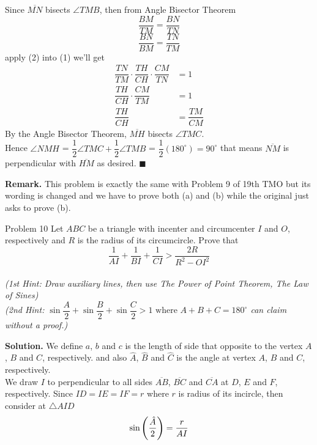 \documentclass[12pt]{article}
\begin{document}
Since $\overline{MN}$ bisects $\angle{TMB}$, then from Angle Bisector Theorem
\begin{equation*}
\dfrac{BM}{TM}  = \dfrac{BN}{TN} 
\end{equation*}
\begin{equation}
\dfrac{BN}{BM}  = \dfrac{TN}{TM} 
\end{equation}
apply (2) into (1) we'll get
\begin{align*}
\dfrac{TN}{TM} \cdot \dfrac{TH}{CH} \cdot \dfrac{CM}{TN} &= 1 \\
\dfrac{TH}{CH} \cdot \dfrac{CM}{TM} &= 1 \\
\dfrac{TH}{CH} &= \dfrac{TM}{CM}
\end{align*}
By the Angle Bisector Theorem, $\overline{MH}$ bisects $\angle{TMC}$.\\
Hence $\angle{NMH}$ = $\dfrac{1}{2}\angle{TMC} + \dfrac{1}{2}\angle{TMB}$ = $\dfrac{1}{2}(180^{\circ}) = 90^{\circ}$ that means $\overline{NM}$ is perpendicular with $\overline{HM}$ as desired. \null\hfill $\blacksquare$
\begin{boxH}
\textbf{Remark.} This problem is exactly the same with Problem 9 of 19th TMO but its wording is changed and we have to prove both (a) and (b) while the original just asks to prove (b).
\end{boxH}
\newpage
\begin{mybox}{Problem 10}
Let $ABC$ be  a triangle with incenter and circumcenter $I$ and $O$, respectively and $R$ is the radius of its circumcircle. Prove that $$\dfrac{1}{AI} + \dfrac{1}{BI} + \dfrac{1}{CI} > \dfrac{2R}{R^2-OI^2}$$\\
\textit {(1st Hint: Draw auxiliary lines, then use The Power of Point Theorem, The Law of Sines)}\\ 
\textit {(2nd Hint: $\sin{\dfrac{A}{2}}+\sin{\dfrac{B}{2}}+\sin{\dfrac{C}{2}} > 1 \text{ where } A+B+C = 180^{\circ}$ can claim without a proof.)}
\end{mybox}
\textbf{Solution.} We define $a$, $b$ and $c$ is the length of side that opposite to the vertex $A$, $B$ and $C$, respectively. and also $\hat{A}$, $\hat{B}$ and $\hat{C}$ is the angle at vertex $A$, $B$ and $C$, respectively.\\
We draw $I$ to perpendicular to all sides $\overline{AB}$, $\overline{BC}$ and $\overline{CA}$ at $D$, $E$ and $F$, respectively. Since $ID=IE=IF=r$ where $r$ is radius of its incircle, then consider at $\triangle{AID}$
\begin{equation}\setcounter{equation}{1}
\sin{\left(\dfrac{\hat{A}}{2}\right)}=\dfrac{r}{AI}
\end{equation}
\end{document}
